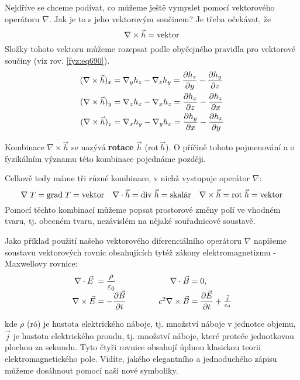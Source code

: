       Nejdříve se chceme podívat, co můžeme ještě vymyslet pomocí vektorového operátoru $\nabla$. 
      Jak je to s jeho vektorovým součinem? Je třeba očekávat, že
      \begin{equation}\label{fyz:eq265}
        \nabla\times\vec{h} = \text{vektor}
      \end{equation}
      Složky tohoto vektoru můžeme rozepsat podle obyčejného pravidla pro vektorové součiny (viz 
      rov. \ref{fyz:eq690}).
      \begin{align*}
        (\nabla\times\vec{h})_x &= \nabla_yh_z-\nabla_zh_y = \dfrac{\partial h_z}{\partial y} - \dfrac{\partial h_y}{\partial z} \\
        (\nabla\times\vec{h})_y &= \nabla_zh_x-\nabla_xh_z = \dfrac{\partial h_x}{\partial z} - \dfrac{\partial h_z}{\partial x} \\
        (\nabla\times\vec{h})_z &= \nabla_xh_y-\nabla_yh_x = \dfrac{\partial h_y}{\partial x} - \dfrac{\partial h_x}{\partial y}
      \end{align*}

      Kombinace $\nabla\times\vec{h}$ se nazývá \textbf{rotace} $\vec{h}$ 
      ($\mathrm{rot}\,\vec{h}$). O příčině tohoto pojmenování a o fyzikálním významu této kombinace 
      pojednáme později.

      Celkově tedy máme tři různé kombinace, v nichž vystupuje operátor $\nabla$:
      \begin{equation*}
        \nabla\;T  =\mathrm{grad\;}T   = \text{vektor} \quad    
        \nabla\cdot\vec{h} =\mathrm{div}\;\vec{h}  = \text{skalár} \quad  
        \nabla\times\vec{h}   =\mathrm{rot}\;\vec{h}    = \text{vektor}
      \end{equation*}
      Pomocí těchto kombinací můžeme popsat prostorové změny polí ve vhodném tvaru, tj. obecném 
      tvaru, nezávislém na nějaké souřadnicové soustavě.

      Jako příklad použití našeho vektorového diferenciálního operátoru $\nabla$ napíšeme soustavu
      vektorových rovnic obsahujících tytéž zákony elektromagnetizmu - Maxwellovy rovnice:
      \begin{equation}\label{fyz:eq266}
        \begin{array}{c @{{}={}} l r @{{}={}} l}
          \ndiver{E} & \dfrac{\rho}{\varepsilon_0}& \ndiver{B}   & 0,                            \\
          \nrot{E}   & -\pder{\vec{B}}{t}   \quad\quad\quad   & c^2\nabla\times\vec{B} & 
          \pder{\vec{E}}{t} + \frac{\vec{j}}{\varepsilon_0}  
        \end{array}
      \end{equation}

      kde $\rho$ (ró) je hustota elektrického náboje, tj. množství náboje v jednotce objemu, 
      $\vec{j}$ je hustota elektrického proudu, tj. množství náboje, které proteče jednotkovou 
      plochou za sekundu. Tyto čtyři rovnice obsahují úplnou klasickou teorii elektromagnetického 
      pole. Vidíte, jakého elegantního a jednoduchého zápisu můžeme dosáhnout pomocí naší nové 
      symboliky.
      
